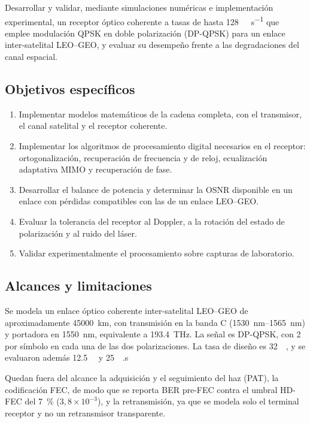 Desarrollar y validar, mediante simulaciones num\'ericas e implementaci\'on
experimental, un receptor \'optico coherente a tasas de hasta
\SI{128}{\giga\bit\per\second} que emplee modulaci\'on QPSK en doble
polarizaci\'on (DP-QPSK) para un enlace inter-satelital LEO--GEO, y evaluar su
desempe\~no frente a las degradaciones del canal espacial.

\subsection*{Objetivos espec\'ificos}

\begin{enumerate}
  \item Implementar modelos matem\'aticos de la cadena completa, con el
        transmisor, el canal satelital y el receptor coherente.
  \item Implementar los algoritmos de procesamiento digital necesarios en el
        receptor: ortogonalizaci\'on, recuperaci\'on de frecuencia y de reloj,
        ecualizaci\'on adaptativa MIMO y recuperaci\'on de fase.
  \item Desarrollar el balance de potencia y determinar la OSNR disponible en
        un enlace con p\'erdidas compatibles con las de un enlace LEO--GEO.
  \item Evaluar la tolerancia del receptor al Doppler, a la rotaci\'on del
        estado de polarizaci\'on y al ruido del l\'aser.
  \item Validar experimentalmente el procesamiento sobre capturas de laboratorio.
\end{enumerate}

\subsection*{Alcances y limitaciones}

Se modela un enlace \'optico coherente inter-satelital LEO--GEO de
aproximadamente \SI{45000}{\kilo\metre}, con transmisi\'on en la banda C
(\SIrange{1530}{1565}{\nano\metre}) y portadora en \SI{1550}{\nano\metre},
equivalente a \SI{193.4}{\tera\hertz}. La se\~nal es DP-QPSK, con
\SI{2}{\bit} por s\'imbolo en cada una de las dos polarizaciones. La tasa de
dise\~no es \SI{32}{\giga\baud}, y se evaluaron adem\'as
\SI{12.5}{\giga\baud} y \SI{25}{\giga\baud}.s

Quedan fuera del alcance la adquisici\'on y el seguimiento del haz (PAT), la
codificaci\'on FEC, de modo que se reporta BER pre-FEC contra el umbral HD-FEC
del \SI{7}{\percent} ($3{,}8\times10^{-3}$), y la retransmisi\'on, ya que se
modela solo el terminal receptor y no un retransmisor transparente.

